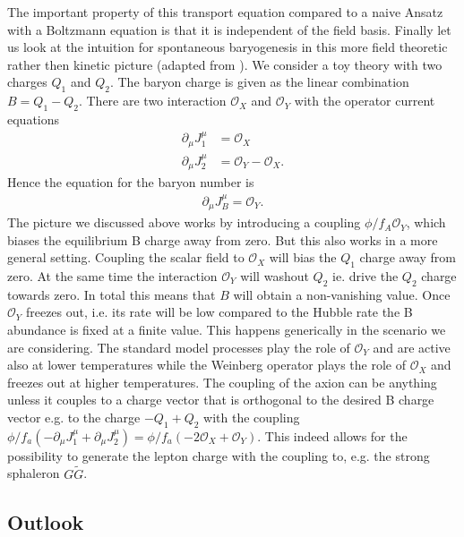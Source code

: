 \documentclass[13pt,a4paper,titlepage]{article}
\begin{document}
The important property of this transport equation compared to a naive Ansatz with a
Boltzmann equation is that it is independent of the field basis.
Finally let us look at the intuition for spontaneous baryogenesis in this more field theoretic rather then kinetic picture (adapted from \cite[sec. 1]{Domcke:2020kcp_Generic_Couplings}).
We consider a toy theory with two charges $Q_1$ and $Q_2$. The baryon charge is given as the
linear combination $B = Q_1 - Q_2$. There are two interaction $\mathcal{O}_X$ and $\mathcal{O}_Y$ with the operator current equations
\begin{align}
    \partial_\mu J_1^\mu &= \mathcal{O}_X \\
    \partial_\mu J_2^\mu &= \mathcal{O}_Y - \mathcal{O}_X.
\end{align}
Hence the equation for the baryon number is
\begin{align}
    \partial_\mu J_B^\mu = \mathcal{O}_Y.
\end{align}
The picture we discussed above works by introducing a coupling $\phi / f_A \mathcal{O}_Y$,
which biases the equilibrium B charge away from zero.
But this also works in a more general setting.
Coupling the scalar field to $\mathcal{O}_X$ will bias the $Q_1$ charge away from zero.
At the same time the interaction $\mathcal{O}_Y$ will washout $Q_2$ ie. drive the $Q_2$ charge towards zero. In total this means that $B$ will obtain a non-vanishing value. Once $\mathcal{O}_Y$ freezes out, i.e. its rate will be low compared to the Hubble rate
the B abundance is fixed at a finite value.
This happens generically in the scenario we are considering. The standard model processes
play the role of $\mathcal{O}_Y$ and are active also at lower temperatures while the Weinberg operator plays the role of $\mathcal{O}_X$ and freezes out at higher temperatures.
The coupling of the axion can be anything unless it couples to a charge vector that is orthogonal to the desired B charge vector e.g. to the charge $- Q_1 + Q_2$ with the coupling $\phi / f_a (- \partial_\mu J_1^\mu + \partial_\mu J_2^\mu) = \phi / f_a (- 2 \mathcal{O}_X + \mathcal{O}_Y)$.
This indeed allows for the possibility to generate the lepton charge with the coupling to, e.g. the
strong sphaleron $G \tilde{G}$.

\newpage
\subsection{Outlook}
\label{sec:outlook}
\end{document}
